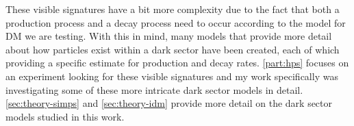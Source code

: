 These visible signatures have a bit more complexity due to the fact that both a production process
and a decay process need to occur according to the model for DM we are testing. With this in mind,
many models that provide more detail about how particles exist within a dark sector have been
created, each of which providing a specific estimate for production and decay rates.
\cref{part:hps} focuses on an experiment looking for these visible signatures and my work
specifically was investigating some of these more intricate dark sector models in detail.
\cref{sec:theory-simps} and \cref{sec:theory-idm} provide more detail on the dark sector models
studied in this work.

